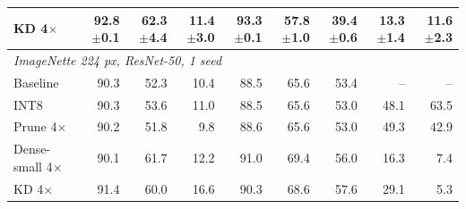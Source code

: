 \begin{tabular}{lrrrrrrrr}
KD 4$\times$ & 92.8{\scriptsize$\pm$0.1} & 62.3{\scriptsize$\pm$4.4} & 11.4{\scriptsize$\pm$3.0} & 93.3{\scriptsize$\pm$0.1} & 57.8{\scriptsize$\pm$1.0} & 39.4{\scriptsize$\pm$0.6} & 13.3{\scriptsize$\pm$1.4} & 11.6{\scriptsize$\pm$2.3} \\
\midrule
\multicolumn{9}{l}{\textit{ImageNette 224 px, ResNet-50, 1 seed}} \\
Baseline & 90.3 & 52.3 & 10.4 & 88.5 & 65.6 & 53.4 & -- & -- \\
INT8 & 90.3 & 53.6 & 11.0 & 88.5 & 65.6 & 53.0 & 48.1 & 63.5 \\
Prune 4$\times$ & 90.2 & 51.8 & 9.8 & 88.6 & 65.6 & 53.0 & 49.3 & 42.9 \\
Dense-small 4$\times$ & 90.1 & 61.7 & 12.2 & 91.0 & 69.4 & 56.0 & 16.3 & 7.4 \\
KD 4$\times$ & 91.4 & 60.0 & 16.6 & 90.3 & 68.6 & 57.6 & 29.1 & 5.3 \\
\bottomrule
\end{tabular}
